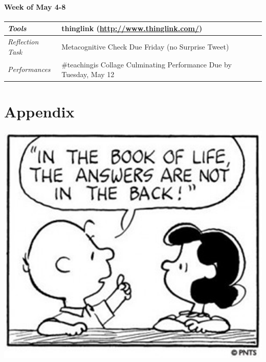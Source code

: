 \documentclass{tufte-handout}
\newcommand{\tabtools}{\faWrench\medspace\textit{Tools}}
\newcommand{\tabcheck}{\faLightbulb\medspace\textit{Reflection Task} & Metacognitive Check Due Friday (no Surprise Tweet) \\}
\newcommand{\tabperformance}{\faTasks\medspace\textit{Performances}}
\newenvironment{tabsched}
	{\small
	\begin{tabular}{p{1.5in}p{5in}}
	\toprule}
	{\bottomrule
	\end{tabular}
	\normalsize}
\begin{document}
\begin{fullwidth}
\subsection{Week of May 4-8}

\begin{tabsched}
	\tabtools & thinglink (\url{http://www.thinglink.com/}) \\
	\midrule
	\tabcheck
	\midrule
	\tabperformance & \#teachingis Collage Culminating Performance Due by Tuesday, May 12 \\
\end{tabsched}
\end{fullwidth}

\newpage



\newpage

\part{Appendix}
\begin{marginfigure}%
	\begin{center}
  \includegraphics[width=0.5\linewidth]{ap-pic.png}
  \label{fig:ap-pic}
	\end{center}
\end{marginfigure}
\end{document}
